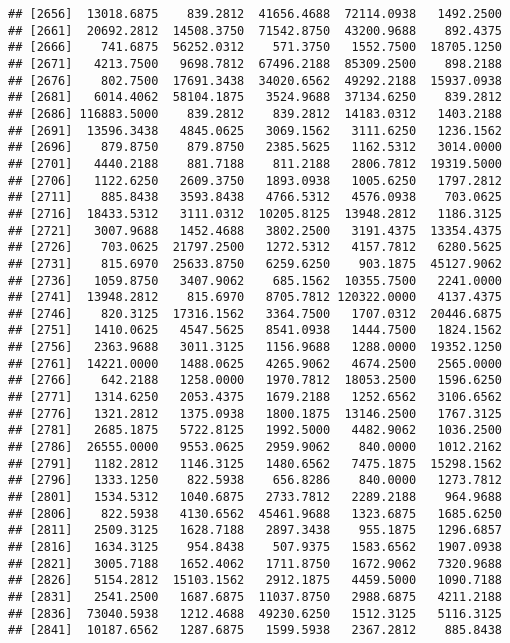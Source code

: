 \documentclass[]{article}
\begin{document}
\begin{verbatim}
## [2656]  13018.6875    839.2812  41656.4688  72114.0938   1492.2500
## [2661]  20692.2812  14508.3750  71542.8750  43200.9688    892.4375
## [2666]    741.6875  56252.0312    571.3750   1552.7500  18705.1250
## [2671]   4213.7500   9698.7812  67496.2188  85309.2500    898.2188
## [2676]    802.7500  17691.3438  34020.6562  49292.2188  15937.0938
## [2681]   6014.4062  58104.1875   3524.9688  37134.6250    839.2812
## [2686] 116883.5000    839.2812    839.2812  14183.0312   1403.2188
## [2691]  13596.3438   4845.0625   3069.1562   3111.6250   1236.1562
## [2696]    879.8750    879.8750   2385.5625   1162.5312   3014.0000
## [2701]   4440.2188    881.7188    811.2188   2806.7812  19319.5000
## [2706]   1122.6250   2609.3750   1893.0938   1005.6250   1797.2812
## [2711]    885.8438   3593.8438   4766.5312   4576.0938    703.0625
## [2716]  18433.5312   3111.0312  10205.8125  13948.2812   1186.3125
## [2721]   3007.9688   1452.4688   3802.2500   3191.4375  13354.4375
## [2726]    703.0625  21797.2500   1272.5312   4157.7812   6280.5625
## [2731]    815.6970  25633.8750   6259.6250    903.1875  45127.9062
## [2736]   1059.8750   3407.9062    685.1562  10355.7500   2241.0000
## [2741]  13948.2812    815.6970   8705.7812 120322.0000   4137.4375
## [2746]    820.3125  17316.1562   3364.7500   1707.0312  20446.6875
## [2751]   1410.0625   4547.5625   8541.0938   1444.7500   1824.1562
## [2756]   2363.9688   3011.3125   1156.9688   1288.0000  19352.1250
## [2761]  14221.0000   1488.0625   4265.9062   4674.2500   2565.0000
## [2766]    642.2188   1258.0000   1970.7812  18053.2500   1596.6250
## [2771]   1314.6250   2053.4375   1679.2188   1252.6562   3106.6562
## [2776]   1321.2812   1375.0938   1800.1875  13146.2500   1767.3125
## [2781]   2685.1875   5722.8125   1992.5000   4482.9062   1036.2500
## [2786]  26555.0000   9553.0625   2959.9062    840.0000   1012.2162
## [2791]   1182.2812   1146.3125   1480.6562   7475.1875  15298.1562
## [2796]   1333.1250    822.5938    656.8286    840.0000   1273.7812
## [2801]   1534.5312   1040.6875   2733.7812   2289.2188    964.9688
## [2806]    822.5938   4130.6562  45461.9688   1323.6875   1685.6250
## [2811]   2509.3125   1628.7188   2897.3438    955.1875   1296.6857
## [2816]   1634.3125    954.8438    507.9375   1583.6562   1907.0938
## [2821]   3005.7188   1652.4062   1711.8750   1672.9062   7320.9688
## [2826]   5154.2812  15103.1562   2912.1875   4459.5000   1090.7188
## [2831]   2541.2500   1687.6875  11037.8750   2988.6875   4211.2188
## [2836]  73040.5938   1212.4688  49230.6250   1512.3125   5116.3125
## [2841]  10187.6562   1287.6875   1599.5938   2367.2812    885.8438

\end{verbatim}
\end{document}
